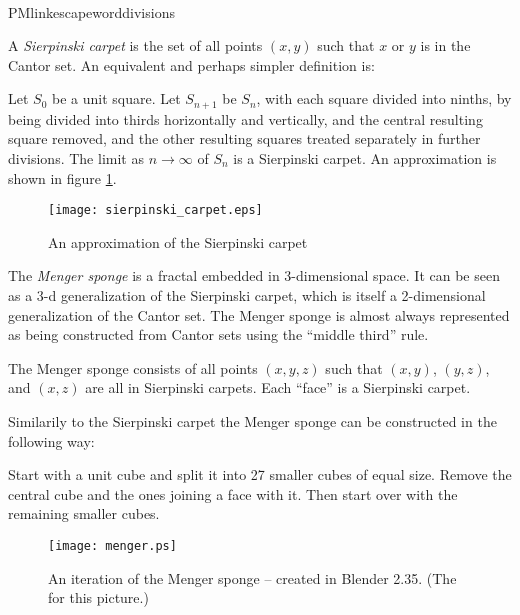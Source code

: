\documentclass[12pt]{article}
\begin{document}
\\PMlinkescapeword{divisions}

A \emph{Sierpinski carpet} is the set of all points $(x, y)$ such that $x$ or $y$ is in
the Cantor set.  An equivalent and perhaps simpler definition is:

Let $S_0$ be a unit square.  Let $S_{n+1}$ be $S_n$, with each square divided
into ninths, by being divided into thirds horizontally and vertically, and the central resulting square removed, and the other resulting squares treated separately in further divisions.  The limit as $n \to \infty$ of $S_n$ is a Sierpinski carpet. An approximation is shown in figure \ref{fig:sierpinski}.

\begin{figure}[h]
\begin{centering}
\texttt{[image: sierpinski\_carpet.eps]}
\caption{An approximation of the Sierpinski carpet}\label{fig:sierpinski}
\end{centering}
\end{figure}

The \emph{Menger sponge} is a fractal embedded in 3-dimensional space.  It can be seen as a 3-d generalization of the Sierpinski carpet, which is itself a 2-dimensional generalization of the Cantor set.  The Menger sponge is almost always represented as being constructed from Cantor sets using the ``middle third'' rule.

The Menger sponge consists of all points $(x, y, z)$ such that $(x, y)$, $(y,z)$, and $(x,z)$ are all in Sierpinski carpets.  Each ``face'' is a Sierpinski carpet.

Similarily to the Sierpinski carpet the Menger sponge can be constructed in the following way:

Start with a unit cube and split it into 27 smaller cubes of equal size. Remove the central cube and the ones joining a face with it. Then start over with the remaining smaller cubes.

\begin{figure}[h]
\begin{centering}
\texttt{[image: menger.ps]}
\caption{An iteration of the Menger sponge -- created in Blender 2.35.
(The  for this picture.)}\label{fig:menger}
\end{centering}
\end{figure}
\end{document}
